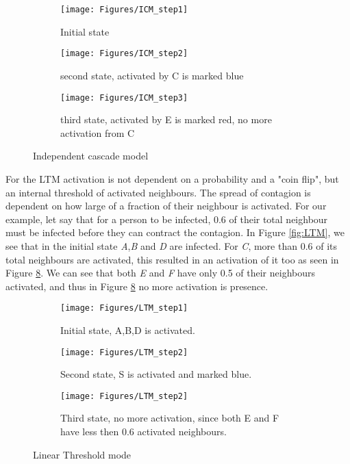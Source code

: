 
\begin{figure}[!ht]
    \begin{subfigure}{0.3\textwidth}
        \texttt{[image: Figures/ICM\_step1]}
        \caption{Initial state} 
        \label{fig:ICM}
    \end{subfigure}
    \begin{subfigure}{0.3\textwidth}
        \texttt{[image: Figures/ICM\_step2]}
        \caption{second state, activated by C is marked blue} 
        \label{fig:ICM2}
    \end{subfigure}
    \begin{subfigure}{0.3\textwidth}
        \texttt{[image: Figures/ICM\_step3]}
        \caption{third state, activated by E is marked red, no more activation from C} 
        \label{fig:ICM3}
    \end{subfigure}
    \caption{Independent cascade model}
    \label{fig:ICM_step}
\end{figure}


For the LTM activation is not dependent on a probability and a "coin flip", but an internal threshold of activated neighbours. The spread of contagion is dependent on how large of a fraction of their neighbour is activated. For our example, let say that for a person to be infected, 0.6 of their total neighbour must be infected before they can contract the contagion. In Figure \ref{fig:LTM}, we see that in the initial state \textit{A},\textit{B} and \textit{D} are infected. For \textit{C}, more than 0.6 of its total neighbours are activated, this resulted in an activation of it too as seen in Figure \ref{fig:linearThresh3}.  We can see that both \textit{E} and \textit{F} have only 0.5 of their neighbours activated, and thus in Figure \ref{fig:linearThresh3} no more activation is presence.


\begin{figure}[!ht] \label{fig:LTM}
    \begin{subfigure}{0.3\textwidth}
        \texttt{[image: Figures/LTM\_step1]}
        \caption{Initial state, A,B,D is activated.} 
        \label{fig:linearThresh}
    \end{subfigure}
    \begin{subfigure}{0.3\textwidth}
        \texttt{[image: Figures/LTM\_step2]}
        \caption{Second state, S is activated and marked blue.} 
        \label{fig:linearThresh2}
    \end{subfigure}
    \begin{subfigure}{0.3\textwidth}
        \texttt{[image: Figures/LTM\_step2]}
        \caption{Third state, no more activation, since both E and F have less then 0.6 activated neighbours.} 
        \label{fig:linearThresh3}
    \end{subfigure}
    \caption{Linear Threshold mode}
\end{figure}


